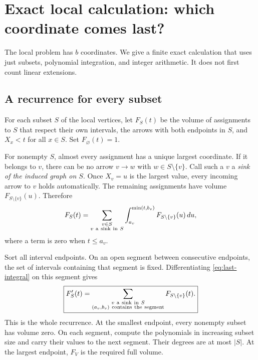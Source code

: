 \section{Exact local calculation: which coordinate comes last?}\label{app:table}

The local problem has \(b\) coordinates. We give a finite exact calculation that uses just subsets, polynomial integration, and integer arithmetic. It does not first count linear extensions.

\subsection{A recurrence for every subset}

For each subset \(S\) of the local vertices, let \(F_S(t)\) be the volume of assignments to \(S\) that respect their own intervals, the arrows with both endpoints in \(S\), and \(X_x<t\) for all \(x\in S\). Set \(F_\varnothing(t)=1\).

For nonempty \(S\), almost every assignment has a unique largest coordinate. If it belongs to \(v\), there can be no arrow \(v\to w\) with \(w\in S\setminus\{v\}\). Call such a \(v\) a \emph{sink of the induced graph on \(S\)}. Once \(X_v=u\) is the largest value, every incoming arrow to \(v\) holds automatically. The remaining assignments have volume \(F_{S\setminus\{v\}}(u)\). Therefore
\begin{equation}\label{eq:last-integral}
F_S(t)=
\sum_{\substack{v\in S\\v\ {\rm a\ sink\ in}\ S}}
\int_{a_v}^{\min(t,b_v)}
  F_{S\setminus\{v\}}(u)\,du,
\end{equation}
where a term is zero when \(t\le a_v\).

Sort all interval endpoints. On an open segment between consecutive endpoints, the set of intervals containing that segment is fixed. Differentiating \eqref{eq:last-integral} on this segment gives
\begin{equation}\label{eq:last-derivative}
\boxed{
F'_S(t)=
\sum_{\substack{v\ {\rm a\ sink\ in}\ S\\
                 (a_v,b_v)\ {\rm contains\ the\ segment}}}
F_{S\setminus\{v\}}(t).
}
\end{equation}
This is the whole recurrence. At the smallest endpoint, every nonempty subset has volume zero. On each segment, compute the polynomials in increasing subset size and carry their values to the next segment. Their degrees are at most \(|S|\). At the largest endpoint, \(F_V\) is the required full volume.

